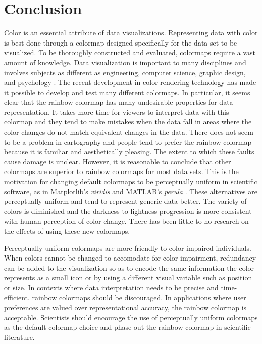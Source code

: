 \documentclass[journal,12pt]{IEEEtran}
\begin{document}
\section{Conclusion}

Color is an essential attribute of data visualizations. Representing data
with color is best done through a colormap designed specifically for the data set to be visualized.
To be thoroughly constructed and evaluated, colormaps require a vast amount of knowledge.
Data visualization is important to many disciplines and involves subjects
as different as engineering, computer science, graphic design,
and psychology \cite{choropleth}. The recent development in color rendering technology has made it 
possible to develop and test many different colormaps. In particular, it seems clear that
the rainbow colormap has many undesirable properties for data representation.
It takes more time for viewers to interpret data with this colormap and they tend to
make mistakes when the data fall in areas where the color changes do not match 
equivalent changes in the data. There does not seem to be a problem in cartography
and people tend to prefer the rainbow colormap because it is familiar and aesthetically pleasing.
The extent to which these faults cause damage is unclear. However, it is reasonable to conclude
that other colormaps are superior to rainbow colormaps for most data sets.
This is the motivation for changing default colormaps to be perceptually uniform
in scientific software, as in Matplotlib's \textit{viridis} and MATLAB's \textit{perula} \cite{viridis,matlab}.
These alternatives are perceptually uniform and tend to represent generic data better.
The variety of colors is diminished and the darkness-to-lightness progression
is more consistent with human perception of color change.
There has been little to no research on the effects of using these new colormaps.

Perceptually uniform colormaps are more friendly to color
impaired individuals. When colors cannot be changed
to accomodate for color impairment, redundancy can be added to the visualization
so as to encode the same information the color represents as a small icon or by using
a different visual variable such as position or size. In contexts where data
interpretation needs to be precise and time-efficient, rainbow colormaps should be discouraged.
In applications where user preferences are valued over representational accuracy,
the rainbow colormap is acceptable. Scientists should 
encourage the use of perceptually uniform colormaps as the default colormap choice and phase out the rainbow colormap
in scientific literature.


\newpage



\end{document}
